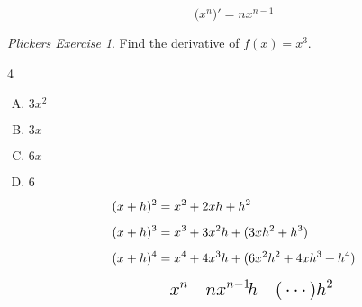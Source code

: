 \documentclass[17pt, handout]{beamer}
\theoremstyle{remark}
\newtheorem{plickers}{Plickers Exercise}
\begin{document}
\begin{frame}
\begin{theorem}%
\[\Big(x^n\Big)' = nx^{n-1}\]
\end{theorem}

\begin{plickers}
Find the derivative of $f(x) = x^3$.
\begin{multicols}4
\begin{enumerate}[A.]
\item $3x^2$ \item $3x$ \item $6x$ \item $6$
\end{enumerate}
\end{multicols}
\end{plickers}
\end{frame}

\begin{frame}
\begin{fact}
\vspace{-3ex}
\begin{align*}
(x+h)^2 &= x^2 + 2xh + h^2 \\[1ex]
(x+h)^3 &= x^3 + 3x^2h + %
	{(3xh^2 + h^3)} \\[1ex]
(x+h)^4 &= x^4 + 4x^3h + %
	{(6x^2h^2 + 4xh^3+h^4)} \\[1.5ex]
&\quad \text{\Large$
	x^n \quad nx^{n-1}\!h \quad (\,\cdots)h^2
	$}
\end{align*}
\end{fact}
\end{frame}

\end{document}
